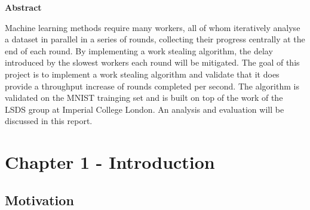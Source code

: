 \documentclass[12pt]{article}
\begin{document}
\vspace*{\fill}
\centerline{\large{\textbf{Abstract}}}
Machine learning methods require many workers, all of whom iteratively analyse a dataset in parallel in a series of rounds, collecting their progress centrally at the end of each round. By implementing a work stealing algorithm, the delay introduced by the slowest workers each round will be mitigated. The goal of this project is to implement a work stealing algorithm and validate that it does provide a throughput increase of rounds completed per second. The algorithm is validated on the MNIST trainging set and is built on top of the work of the LSDS group at Imperial College London. An analysis and evaluation will be discussed in this report.
\vspace*{\fill}

\newpage

\tableofcontents

\newpage

\section{Chapter 1 - Introduction}

\subsection{Motivation}
\end{document}
